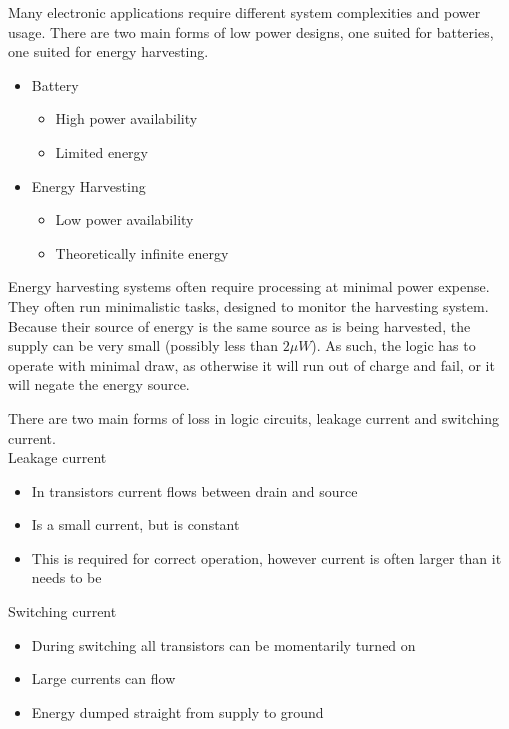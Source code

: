 Many electronic applications require different system complexities and power usage.
There are two main forms of low power designs, one suited for batteries, one suited for energy harvesting.
\begin{itemize}
	\item Battery
	\begin{itemize}
		\item High power availability
		\item Limited energy
	\end{itemize}
	\item Energy Harvesting
	\begin{itemize}
		\item Low power availability
		\item Theoretically infinite energy
	\end{itemize}
\end{itemize}

Energy harvesting systems often require processing at minimal power expense.
They often run minimalistic tasks, designed to monitor the harvesting system.
Because their source of energy is the same source as is being harvested, the supply can be very small (possibly less than $2\mu W$).
As such, the logic has to operate with minimal draw, as otherwise it will run out of charge and fail, or it will negate the energy source.

There are two main forms of loss in logic circuits, leakage current and switching current.
\\
Leakage current
\begin{itemize}
	\item In transistors current flows between drain and source
	\item Is a small current, but is constant
	\item This is required for correct operation, however current is often larger than it needs to be
\end{itemize}

Switching current
\begin{itemize}
	\item During switching all transistors can be momentarily turned on
	\item Large currents can flow
	\item Energy dumped straight from supply to ground
\end{itemize}
